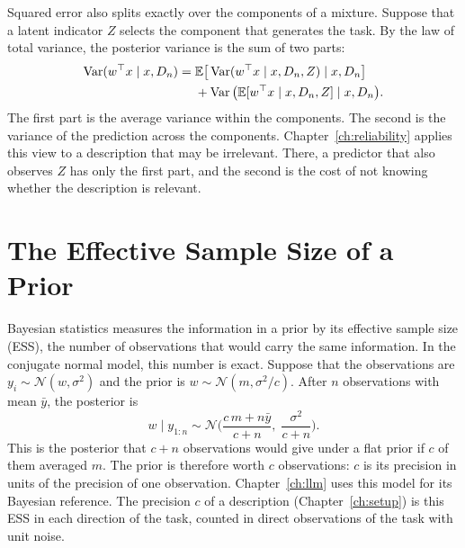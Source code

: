 Squared error also splits exactly over the components of a mixture. Suppose that a latent indicator $Z$ selects the component that generates the task. By the law of total variance, the posterior variance is the sum of two parts:
\begin{equation}\label{eq:bg-total-variance}
\begin{split}
    \operatorname{Var}(w^\top x \mid x, D_n) ={}& \mathbb{E}\big[\operatorname{Var}(w^\top x \mid x, D_n, Z) \mid x, D_n\big] \\
    &+ \operatorname{Var}\big(\mathbb{E}[w^\top x \mid x, D_n, Z] \mid x, D_n\big).
\end{split}
\end{equation}
The first part is the average variance within the components. The second is the variance of the prediction across the components. Chapter~\ref{ch:reliability} applies this view to a description that may be irrelevant. There, a predictor that also observes $Z$ has only the first part, and the second is the cost of not knowing whether the description is relevant.

\section{The Effective Sample Size of a Prior}\label{sec:bg-ess}
Bayesian statistics measures the information in a prior by its effective sample size (ESS), the number of observations that would carry the same information. In the conjugate normal model, this number is exact. Suppose that the observations are $y_i \sim \mathcal{N}(w, \sigma^2)$ and the prior is $w \sim \mathcal{N}(m, \sigma^2 / c)$. After $n$ observations with mean $\bar y$, the posterior is
\[
    w \mid y_{1:n} \sim \mathcal{N}\Big(\frac{c\,m + n \bar y}{c + n},\; \frac{\sigma^2}{c + n}\Big).
\]
This is the posterior that $c + n$ observations would give under a flat prior if $c$ of them averaged $m$. The prior is therefore worth $c$ observations: $c$ is its precision in units of the precision of one observation. Chapter~\ref{ch:llm} uses this model for its Bayesian reference. The precision $c$ of a description (Chapter~\ref{ch:setup}) is this ESS in each direction of the task, counted in direct observations of the task with unit noise.

